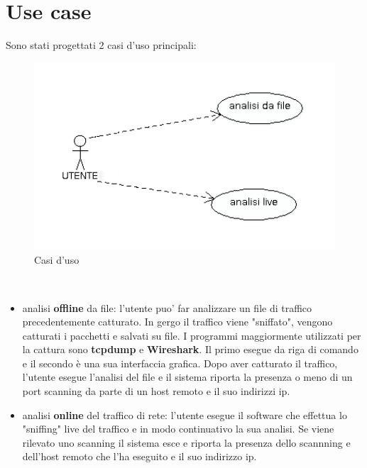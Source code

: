 \documentclass[a4paper,12pt]{article} %
\begin{document}
\newpage

\section{Use case}

Sono stati progettati 2 casi d'uso principali:
\begin{figure}[htbp]
 \begin{center}
  \includegraphics[width=15cm]{usecase1.png}
  \end{center}
  \caption{\label{fig_caso_generale} Casi d'uso}
 \end{figure}\\


\begin{itemize}


\item analisi \textbf{offline} da file: l'utente puo' far analizzare un file di traffico precedentemente catturato. In gergo
il traffico viene "sniffato", vengono catturati i pacchetti e salvati su file. I programmi maggiormente utilizzati per la cattura sono \textbf{tcpdump} e \textbf{Wireshark}. Il primo esegue da riga di comando e il secondo è una sua interfaccia grafica. Dopo aver catturato il traffico, l'utente esegue l'analisi del file e il sistema riporta 
la presenza o meno di un port scanning da parte di un host remoto e il suo indirizzi ip.

\item analisi \textbf{online} del traffico di rete: l'utente esegue il software che effettua lo "sniffing" live 
del traffico e in modo continuativo la sua analisi. Se viene rilevato uno scanning il sistema esce e riporta la presenza dello scannning e dell'host remoto che l'ha eseguito e il suo indirizzo ip. 

\end{itemize}
\end{document}
